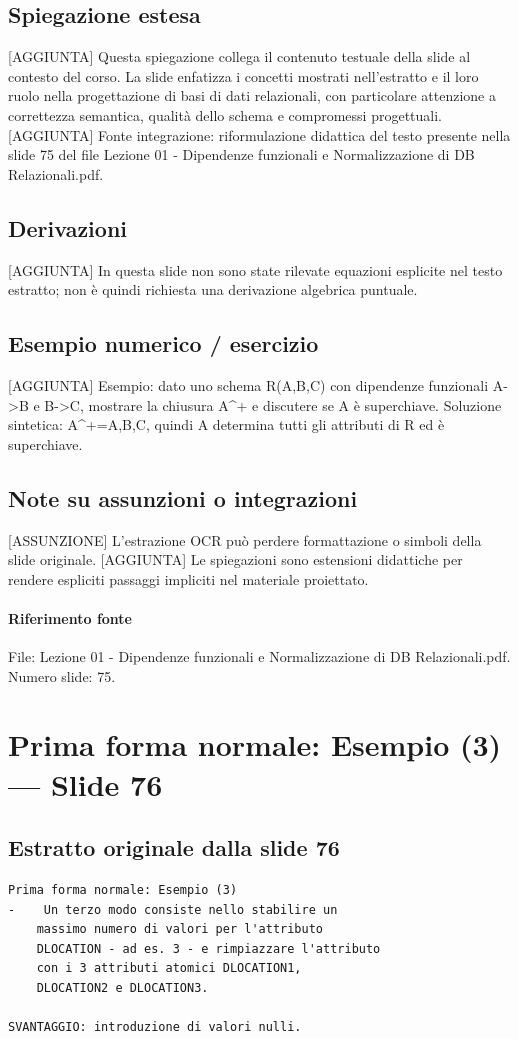\documentclass[11pt]{article}
\begin{document}
\subsection*{Spiegazione estesa}
[AGGIUNTA] Questa spiegazione collega il contenuto testuale della slide al contesto del corso. La slide enfatizza i concetti mostrati nell'estratto e il loro ruolo nella progettazione di basi di dati relazionali, con particolare attenzione a correttezza semantica, qualità dello schema e compromessi progettuali.
[AGGIUNTA] Fonte integrazione: riformulazione didattica del testo presente nella slide 75 del file Lezione 01 - Dipendenze funzionali e Normalizzazione di DB Relazionali.pdf.
\subsection*{Derivazioni}
[AGGIUNTA] In questa slide non sono state rilevate equazioni esplicite nel testo estratto; non è quindi richiesta una derivazione algebrica puntuale.
\subsection*{Esempio numerico / esercizio}
[AGGIUNTA] Esempio: dato uno schema R(A,B,C) con dipendenze funzionali A->B e B->C, mostrare la chiusura A^+ e discutere se A è superchiave. Soluzione sintetica: A^+={A,B,C}, quindi A determina tutti gli attributi di R ed è superchiave.
\subsection*{Note su assunzioni o integrazioni}
[ASSUNZIONE] L'estrazione OCR può perdere formattazione o simboli della slide originale.
[AGGIUNTA] Le spiegazioni sono estensioni didattiche per rendere espliciti passaggi impliciti nel materiale proiettato.
\paragraph{Riferimento fonte} File: Lezione 01 - Dipendenze funzionali e Normalizzazione di DB Relazionali.pdf. Numero slide: 75.
\section{Prima forma normale: Esempio (3) --- Slide 76}
\subsection*{Estratto originale dalla slide 76}
\begin{lstlisting}
Prima forma normale: Esempio (3)
-    Un terzo modo consiste nello stabilire un
    massimo numero di valori per l'attributo
    DLOCATION - ad es. 3 - e rimpiazzare l'attributo
    con i 3 attributi atomici DLOCATION1,
    DLOCATION2 e DLOCATION3.

SVANTAGGIO: introduzione di valori nulli.
\end{lstlisting}
\end{document}
